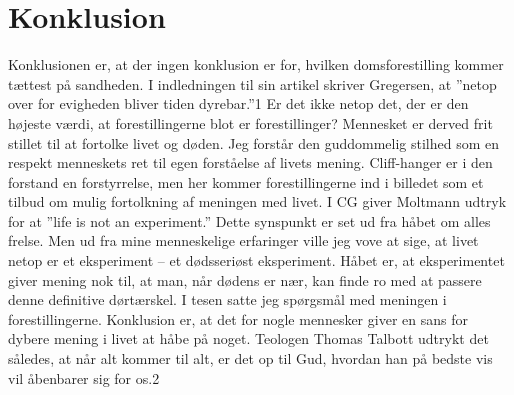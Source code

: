 \chapter{Konklusion}
Konklusionen er, at der ingen konklusion er for, hvilken domsforestilling kommer tættest på sandheden. I indledningen til sin artikel skriver Gregersen, at ”netop over for evigheden bliver tiden dyrebar.”1 Er det ikke netop det, der er den højeste værdi, at forestillingerne blot er forestillinger? Mennesket er derved frit stillet til at fortolke livet og døden. Jeg forstår den guddommelig stilhed som en respekt menneskets ret til egen forståelse af livets mening. Cliff-hanger er i den forstand en forstyrrelse, men her kommer forestillingerne ind i billedet som et tilbud om mulig fortolkning af meningen med livet. I CG giver Moltmann udtryk for at ”life is not an experiment.” Dette synspunkt er set ud fra håbet om alles frelse. Men ud fra mine menneskelige erfaringer ville jeg vove at sige, at livet netop er et eksperiment – et dødsseriøst eksperiment. Håbet er, at eksperimentet giver mening nok til, at man, når dødens er nær, kan finde ro med at passere denne definitive dørtærskel. I tesen satte jeg spørgsmål med meningen i forestillingerne. Konklusion er, at det for nogle mennesker giver en sans for dybere mening i livet at håbe på noget. Teologen Thomas Talbott udtrykt det således, at når alt kommer til alt, er det op til Gud, hvordan han på bedste vis vil åbenbarer sig for os.2